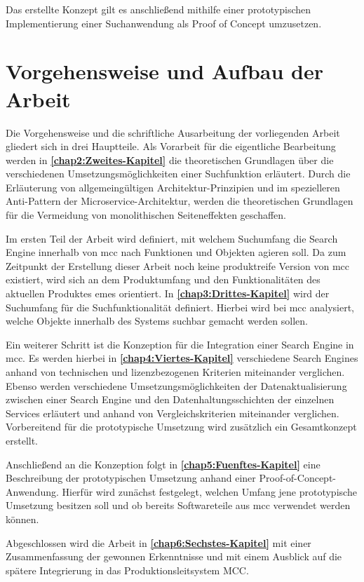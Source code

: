 Das erstellte Konzept gilt es anschließend mithilfe einer prototypischen Implementierung einer Suchanwendung als \glqq Proof of Concept\grqq{} umzusetzen.

\section{Vorgehensweise und Aufbau der Arbeit\label{sec1.3:Unterpunkt-3}}

Die Vorgehensweise und die schriftliche Ausarbeitung der vorliegenden Arbeit gliedert sich in drei Hauptteile. Als Vorarbeit für die eigentliche Bearbeitung werden in \textbf{\autoref{chap2:Zweites-Kapitel}} die theoretischen Grundlagen über die verschiedenen Umsetzungsmöglichkeiten einer Suchfunktion erläutert. Durch die Erläuterung von allgemeingültigen Architektur-Prinzipien und im spezielleren Anti-Pattern der Microservice-Architektur, werden die theoretischen Grundlagen für die Vermeidung von monolithischen Seiteneffekten geschaffen.

Im ersten Teil der Arbeit wird definiert, mit welchem Suchumfang die Search Engine innerhalb von \gls{mcc} nach Funktionen und Objekten agieren soll. Da zum Zeitpunkt der Erstellung dieser Arbeit noch keine produktreife Version von \gls{mcc} existiert, wird sich an dem Produktumfang und den Funktionalitäten des aktuellen Produktes \gls{emes} orientiert. In \textbf{\autoref{chap3:Drittes-Kapitel}} wird der Suchumfang für die Suchfunktionalität definiert. Hierbei wird bei \gls{mcc} analysiert, welche Objekte innerhalb des Systems \glqq suchbar\grqq{} gemacht werden sollen.

Ein weiterer Schritt ist die Konzeption für die Integration einer Search Engine in \gls{mcc}. Es werden hierbei in \textbf{\autoref{chap4:Viertes-Kapitel}} verschiedene Search Engines anhand von technischen und lizenzbezogenen Kriterien miteinander verglichen. Ebenso werden verschiedene Umsetzungsmöglichkeiten der Datenaktualisierung zwischen einer Search Engine und den Datenhaltungsschichten der einzelnen Services erläutert und anhand von Vergleichskriterien miteinander verglichen. Vorbereitend für die prototypische Umsetzung wird zusätzlich ein Gesamtkonzept erstellt.

Anschließend an die Konzeption folgt in \textbf{\autoref{chap5:Fuenftes-Kapitel}} eine Beschreibung der prototypischen Umsetzung anhand einer Proof-of-Concept-Anwendung. Hierfür wird zunächst festgelegt, welchen Umfang jene prototypische Umsetzung besitzen soll und ob bereits Softwareteile aus \gls{mcc} verwendet werden können.

Abgeschlossen wird die Arbeit in \textbf{\autoref{chap6:Sechstes-Kapitel}} mit einer Zusammenfassung der gewonnen Erkenntnisse und mit einem Ausblick auf die spätere Integrierung in das Produktionsleitsystem MCC.